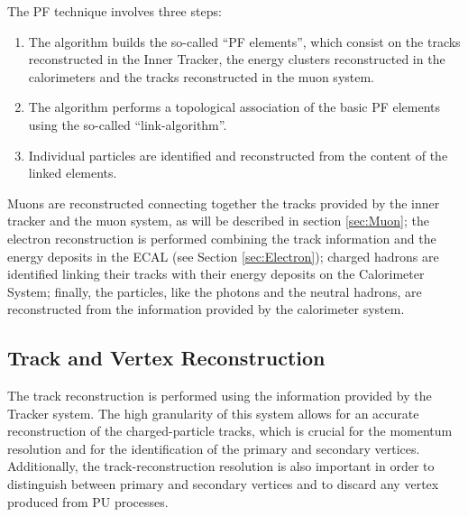 \noindent The PF technique involves three steps: 

\begin{enumerate}
 \item The algorithm builds the so-called ``PF elements'', which consist on the tracks reconstructed in 
 the Inner Tracker, the energy clusters reconstructed in the calorimeters and 
 the tracks reconstructed in the muon system. 
 \item The algorithm performs a topological association of the basic PF elements 
 using the so-called ``link-algorithm''.
 \item Individual particles are identified and reconstructed from the content of the linked elements. 
\end{enumerate}

\noindent Muons are reconstructed connecting together the tracks 
provided by the inner tracker and the muon system, as will be described 
in section \ref{sec:Muon}; the electron reconstruction is performed 
combining the track information and the energy deposits in the 
ECAL (see Section \ref{sec:Electron}); charged hadrons are identified linking 
their tracks with their energy deposits on the Calorimeter System; finally, the 
 particles, like the photons and the neutral hadrons, are reconstructed from the 
information provided by the calorimeter system.

\subsection{Track and Vertex Reconstruction}
\label{subsec:TrackReco}

\noindent The track reconstruction is performed using the information provided by the Tracker system. The high 
granularity of this system allows for an accurate reconstruction of the charged-particle tracks, which is 
crucial for the momentum resolution and for the identification of the primary and secondary 
vertices. Additionally, the track-reconstruction resolution is also important 
in order to distinguish between primary and secondary vertices and to discard 
any vertex produced from PU processes.\\


